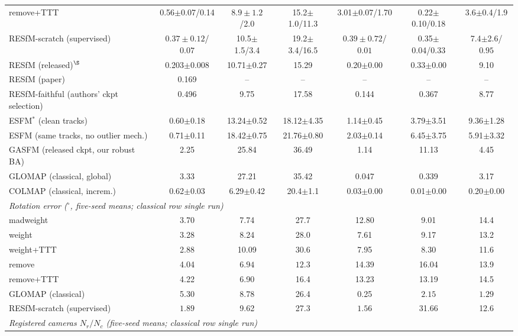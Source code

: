 \documentclass{article}
\newcommand{\mad}{madweight}
\renewcommand{\deg}{^{\circ}}
\begin{document}
\begin{table}[t]
{\begin{tabular}{lcccccc}
remove+TTT   & 0.56$\pm$0.07/0.14 & $\mathbf{8.9\pm 1.2}$/2.0 & 15.2$\pm$1.0/11.3 & 3.01$\pm$0.07/1.70 & 0.22$\pm$0.10/0.18 & 3.6$\pm$0.4/1.9\\
RESfM-scratch (supervised)  & $\mathbf{0.37\pm 0.12}$/$\mathbf{0.07}$ & 10.5$\pm$1.5/3.4 & 19.2$\pm$3.4/16.5 & $\mathbf{0.39\pm 0.72}$/$\mathbf{0.01}$ & 0.35$\pm$0.04/0.33 & 7.4$\pm$2.6/$\mathbf{0.95}$\\
\midrule
RESfM (released)$^{\S}$    & 0.203$\pm$0.008 & 10.71$\pm$0.27 & 15.29 & 0.20$\pm$0.00 & 0.33$\pm$0.00 & 9.10\\
RESfM (paper)               & 0.169 & -- & -- & -- & -- & --\\
RESfM-faithful (authors' ckpt selection) & 0.496 & 9.75 & 17.58 & 0.144 & 0.367 & 8.77\\
ESFM$^{\ast}$ (clean tracks) & 0.60$\pm$0.18 & 13.24$\pm$0.52 & 18.12$\pm$4.35 & 1.14$\pm$0.45 & 3.79$\pm$3.51 & 9.36$\pm$1.28\\
ESFM (same tracks, no outlier mech.) & 0.71$\pm$0.11 & 18.42$\pm$0.75 & 21.76$\pm$0.80 & 2.03$\pm$0.14 & 6.45$\pm$3.75 & 5.91$\pm$3.32\\
GASFM (released ckpt, our robust BA) & 2.25 & 25.84 & 36.49 & 1.14 & 11.13 & 4.45\\
GLOMAP (classical, global)  & 3.33 & 27.21 & 35.42 & $\mathbf{0.047}$ & 0.339 & 3.17\\
COLMAP (classical, increm.) & 0.62$\pm$0.03 & 6.29$\pm$0.42 & 20.4$\pm$1.1 & 0.03$\pm$0.00 & 0.01$\pm$0.00 & 0.20$\pm$0.00\\
\midrule
\multicolumn{7}{l}{\emph{Rotation error ($\deg$, five-seed means; classical row single run)}}\\[1pt]
\mad{}       & 3.70 & 7.74 & 27.7 & 12.80 & 9.01 & 14.4\\
weight       & 3.28 & 8.24 & 28.0 & 7.61 & 9.17 & 13.2\\
weight+TTT   & 2.88 & 10.09 & 30.6 & 7.95 & 8.30 & 11.6\\
remove       & 4.04 & $\mathbf{6.94}$ & $\mathbf{12.3}$ & 14.39 & 16.04 & 13.9\\
remove+TTT   & 4.22 & 6.90 & 16.4 & 13.23 & 13.19 & 14.5\\
GLOMAP (classical)          & 5.30 & 8.78 & 26.4 & 0.25 & $\mathbf{2.15}$ & $\mathbf{1.29}$\\
RESfM-scratch (supervised)  & $\mathbf{1.89}$ & 9.62 & 27.3 & $\mathbf{1.56}$ & 31.66 & 12.6\\
\midrule
\multicolumn{7}{l}{\emph{Registered cameras $N_r/N_c$ (five-seed means; classical row single run)}}\\[1pt]

\end{tabular}}
\end{table}
\end{document}
